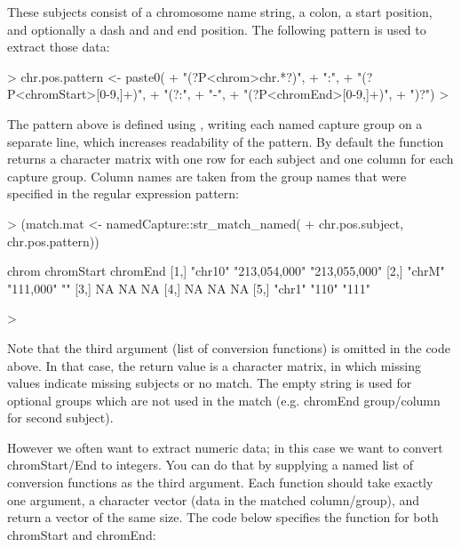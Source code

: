These subjects consist of a chromosome name string, a colon, a start
position, and optionally a dash and and end position. The following
pattern is used to extract those data:

\begin{Schunk}
\begin{Sinput}
> chr.pos.pattern <- paste0(
+   "(?P<chrom>chr.*?)",
+   ":",
+   "(?P<chromStart>[0-9,]+)",
+   "(?:",
+     "-",
+     "(?P<chromEnd>[0-9,]+)",
+   ")?")
> 
\end{Sinput}
\end{Schunk}

The pattern above is defined using , writing each named capture
group on a separate line, which increases readability of the pattern.
By default
the  function returns a character matrix with
one row for each subject and one column for each capture group. Column
names are taken from the group names that were specified in the
regular expression pattern:

\begin{Schunk}
\begin{Sinput}
> (match.mat <- namedCapture::str_match_named(
+   chr.pos.subject, chr.pos.pattern))
\end{Sinput}
\begin{Soutput}
     chrom   chromStart    chromEnd     
[1,] "chr10" "213,054,000" "213,055,000"
[2,] "chrM"  "111,000"     ""           
[3,] NA      NA            NA           
[4,] NA      NA            NA           
[5,] "chr1"  "110"         "111"        
\end{Soutput}
\begin{Sinput}
> 
\end{Sinput}
\end{Schunk}


Note that the third argument (list of conversion functions) is omitted
in the code above. In that case, the return value is a character
matrix, in which missing values indicate missing subjects or no
match. The empty string is used for optional groups which are not used
in the match (e.g. chromEnd group/column for second subject).

However we often want to extract numeric data; in this case we want to
convert chromStart/End to integers. You can do that by supplying a
named list of conversion functions as the third argument. Each
function should take exactly one argument, a character vector (data in
the matched column/group), and return a vector of the same size. The
code below specifies the  function for both chromStart
and chromEnd:

